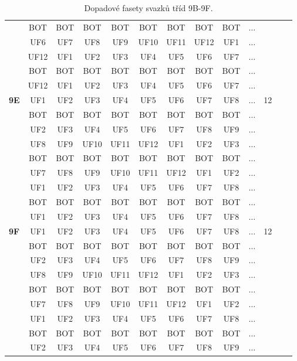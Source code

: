 \begin{table}[h!]
\begin{tabular}{|l|c|c|c|c|c|c|c|c|c|c|c|c|}
 & BOT & BOT & BOT & BOT & BOT & BOT & BOT & BOT & $\dots$ & \\
 & UF6 & UF7 & UF8 & UF9 & UF10 & UF11 & UF12 & UF1 & $\dots$ & \\
 & UF12 & UF1 & UF2 & UF3 & UF4 & UF5 & UF6 & UF7 & $\dots$ & \\
 & BOT & BOT & BOT & BOT & BOT & BOT & BOT & BOT & $\dots$ & \\
 & UF12 & UF1 & UF2 & UF3 & UF4 & UF5 & UF6 & UF7 & $\dots$ & \\
\hline \hline
\textbf{9E} & UF1 & UF2 & UF3 & UF4 & UF5 & UF6 & UF7 & UF8 & $\dots$ & 12\\
 & BOT & BOT & BOT & BOT & BOT & BOT & BOT & BOT & $\dots$ & \\
 & UF2 & UF3 & UF4 & UF5 & UF6 & UF7 & UF8 & UF9 & $\dots$ & \\
 & UF8 & UF9 & UF10 & UF11 & UF12 & UF1 & UF2 & UF3 & $\dots$ & \\
 & BOT & BOT & BOT & BOT & BOT & BOT & BOT & BOT & $\dots$ & \\
 & UF7 & UF8 & UF9 & UF10 & UF11 & UF12 & UF1 & UF2 & $\dots$ & \\
 & UF1 & UF2 & UF3 & UF4 & UF5 & UF6 & UF7 & UF8 & $\dots$ & \\
 & BOT & BOT & BOT & BOT & BOT & BOT & BOT & BOT & $\dots$ & \\
 & UF1 & UF2 & UF3 & UF4 & UF5 & UF6 & UF7 & UF8 & $\dots$ & \\
\hline \hline
\textbf{9F} & UF1 & UF2 & UF3 & UF4 & UF5 & UF6 & UF7 & UF8 & $\dots$ & 12\\
 & BOT & BOT & BOT & BOT & BOT & BOT & BOT & BOT & $\dots$ & \\
 & UF2 & UF3 & UF4 & UF5 & UF6 & UF7 & UF8 & UF9 & $\dots$ & \\
 & UF8 & UF9 & UF10 & UF11 & UF12 & UF1 & UF2 & UF3 & $\dots$ & \\
 & BOT & BOT & BOT & BOT & BOT & BOT & BOT & BOT & $\dots$ & \\
 & UF7 & UF8 & UF9 & UF10 & UF11 & UF12 & UF1 & UF2 & $\dots$ & \\
 & UF1 & UF2 & UF3 & UF4 & UF5 & UF6 & UF7 & UF8 & $\dots$ & \\
 & BOT & BOT & BOT & BOT & BOT & BOT & BOT & BOT & $\dots$ & \\
 & UF2 & UF3 & UF4 & UF5 & UF6 & UF7 & UF8 & UF9 & $\dots$ & \\
\hline  
\end{tabular}
\caption{Dopadové fasety svazků tříd 9B-9F.}
\label{table:TableClasses5}
\end{table}

